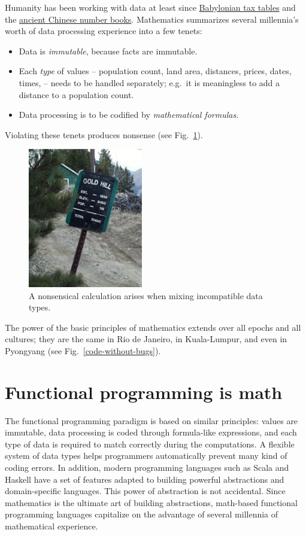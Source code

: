 Humanity has been working with data at least since \href{https://www.nytimes.com/2017/08/29/science/trigonometry-babylonian-tablet.html?mcubz=0}{Babylonian tax tables}
and the \href{http://quatr.us/china/science/chinamath.htm}{ancient Chinese number books}.
Mathematics summarizes several millennia's worth of data processing
experience into a few tenets:
\begin{itemize}
\item Data is \emph{immutable}, because facts are immutable. 
\item Each \emph{type} of values – population count, land area, distances,
prices, dates, times, – needs to be handled separately; e.g.\ it
is meaningless to add a distance to a population count.
\item Data processing is to be codified by \emph{mathematical formulas}. 
\end{itemize}
Violating these tenets produces nonsense (see Fig.\ \ref{nonsense-math}).
\begin{figure}
\begin{centering}
\includegraphics[width=5cm]{type-error}
\par\end{centering}
\caption{A nonsensical calculation arises when mixing incompatible data types.}
\label{nonsense-math}
\end{figure}

The power of the basic principles of mathematics extends over all
epochs and all cultures; they are the same in Rio de Janeiro, in Kuala-Lumpur,
and even in Pyongyang (see Fig.\ \ref{code-without-bugs}).

\section{Functional programming is math}

The functional programming paradigm is based on similar principles:
values are immutable, data processing is coded through formula-like
expressions, and each type of data is required to match correctly
during the computations. A flexible system of data types helps programmers
automatically prevent many kind of coding errors. In addition, modern
programming languages such as Scala and Haskell have a set of features
adapted to building powerful abstractions and domain-specific languages.
This power of abstraction is not accidental. Since mathematics is
the ultimate art of building abstractions, math-based functional programming
languages capitalize on the advantage of several millennia of mathematical
experience.

